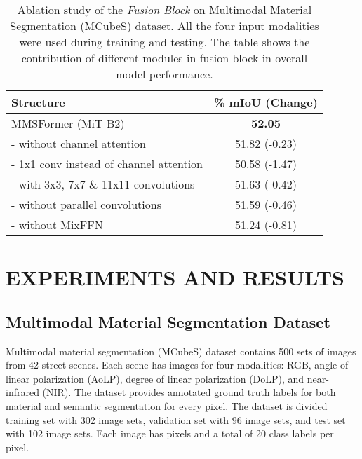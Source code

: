 \documentclass{article}
\begin{document}
\begin{table}[th]
\centering
\caption{Ablation study of the {\it Fusion Block} on Multimodal Material Segmentation (MCubeS) \cite{Liang2022MCubeS} dataset. All the four input modalities were used during training and testing. The table shows the contribution of different modules in fusion block in overall model performance.}
\setlength{\tabcolsep}{1pt}
\begin{tabular}{lc}
    \toprule
    Structure                                            & \% mIoU (Change) \\
    \midrule
    \midrule 
    MMSFormer (MiT-B2)                                   & \textbf{52.05}\\
    \midrule
    \hspace{3mm} - without channel attention             & 51.82 {\footnotesize \color{red} (-0.23)} \\
    \hspace{3mm} - 1x1 conv instead of channel attention & 50.58 {\footnotesize \color{red} (-1.47)} \\
    \hspace{3mm} - with 3x3, 7x7 \& 11x11 convolutions   & 51.63 {\footnotesize \color{red} (-0.42)} \\
    \hspace{3mm} - without parallel convolutions         & 51.59 {\footnotesize \color{red} (-0.46)} \\
    \hspace{3mm} - without MixFFN                        & 51.24 {\footnotesize \color{red} (-0.81)} \\
    \bottomrule
\end{tabular}
\label{tab:fusion-block-ablation-study}
\end{table} 


\section{EXPERIMENTS AND RESULTS}
\label{sec:experiment}
\subsection{Multimodal Material Segmentation Dataset}
Multimodal material segmentation (MCubeS) dataset 
\cite{Liang2022MCubeS} contains 500 sets of images from 42 street scenes. Each scene has images for four modalities: RGB, angle of linear polarization (AoLP), degree of linear polarization (DoLP), and near-infrared (NIR). The dataset provides annotated ground truth labels for both material and semantic segmentation for every pixel. The dataset is divided training set with 302 image sets, validation set with 96 image sets, and test set with 102 image sets. Each image has   pixels and a total of 20 class labels per pixel. 
\end{document}
